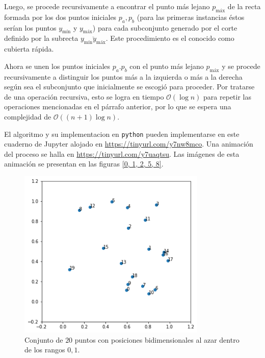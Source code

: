 \documentclass[paper=leter, fontsize=11pt]{scrartcl}
\numberwithin{equation}{section}		%
\numberwithin{figure}{section}			%
\numberwithin{table}{section}				%
\begin{document}
Luego, se procede recursivamente a encontrar el punto más lejano $p_{\text{máx}}$ de la recta formada por los dos puntos iniciales $p_a, p_b$ (para las primeras instancias éstos serían los puntos $y_{\text{mín}}$ y $y_{\text{máx}}$) para cada subconjunto generado por el corte definido por la subrecta $\overline{y_{\text{mín}} y_{\text{máx}}}$. Este procedimiento es el conocido como cubierta rápida.

Ahora se unen los puntos iniciales $p_a. p_b$ con el punto más lejano $p_{\text{máx}}$ y se procede recursivamente a distinguir los puntos más a la izquierda o más a la derecha según sea el subconjunto que inicialmente se escogió para proceder. Por tratarse de una operación recursiva, esto se logra en tiempo $\mathcal{O}(\log{n})$ para repetir las operaciones mencionadas en el párrafo anterior, por lo que se espera una complejidad de $\mathcal{O}((n + 1) \log{n})$.

El algoritmo y su implementacion en \texttt{python} pueden implementarse en este cuaderno de Jupyter alojado en \url{https://tinyurl.com/y7nw8mco}. Una animación del proceso se halla en \url{https://tinyurl.com/y7uaqtsu}. Las imágenes de esta animación se presentan en las figuras \ref{0, 1, 2, 5, 8}.

\begin{figure}
    \centering
    \includegraphics[width=0.8\textwidth]{0.png}
    \caption{Conjunto de $20$ puntos con posiciones bidimensionales al azar dentro de los rangos $0, 1$.}
    \label{0}
\end{figure}
\end{document}
